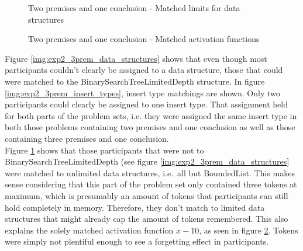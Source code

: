 \documentclass[hidelinks]{scrartcl}
\begin{document}
\begin{figure}[H]
	\caption{Two premises and one conclusion - Matched limits for data structures}
	\label{img:exp2_3prem_limits}
	\begin{center}
	\end{center}
\end{figure}

\begin{figure}[H]
	\caption{Two premises and one conclusion - Matched activation functions}
	\label{img:exp2_3prem_activation_functions}
	\begin{center}
	\end{center}
\end{figure}

Figure \ref{img:exp2_3prem_data_structures} shows that even though most participants couldn't clearly be assigned to a data structure, those that could were matched to the BinarySearchTreeLimitedDepth structure. In figure \ref{img:exp2_3prem_insert_types}, insert type matchings are shown. Only two participants could clearly be assigned to one insert type. That assignment held for both parts of the problem sets, i.e. they were assigned the same insert type in both those problems containing two premises and one conclusion as well as those containing three premises and one conclusion. \\
Figure \ref{img:exp2_3prem_limits} shows that those participants that were not to BinarySearchTreeLimitedDepth (see figure \ref{img:exp2_3prem_data_structures} were matched to unlimited data structures, i.e.\ all but BoundedList. This makes sense considering that this part of the problem set only contained three \gls{token}s at maximum, which is presumably an amount of \gls{token}s that participants can still hold completely in memory. Therefore, they don't match to limited data structures that might already cap the amount of \gls{token}s remembered. This also explains the solely matched activation function $x-10$, as seen in figure \ref{img:exp2_3prem_activation_functions}. Tokens were simply not plentiful enough to see a forgetting effect in participants. \\
\end{document}
